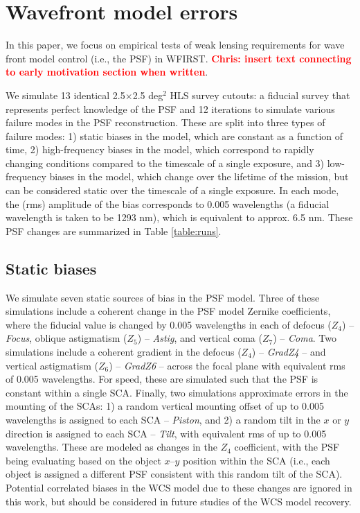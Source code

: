 \documentclass[aps,prd, amsmath,amssymb,superscriptaddress,showkeys,nofootinbib,reprint,preprintnumbers]{revtex4-1}
\newcommand{\verify}[1]{\textcolor{red}{\textbf{{#1}}}}
\begin{document}
\section{Wavefront model errors}\label{sec:results}

In this paper, we focus on empirical tests of weak lensing requirements for wave front model control (i.e., the PSF) in WFIRST. \verify{Chris: insert text connecting to early motivation section when written}. 

We simulate 13 identical 2.5$\times$2.5 deg$^2$ HLS survey cutouts: a fiducial survey that represents perfect knowledge of the PSF and 12 iterations to simulate various failure modes in the PSF reconstruction. 
These are split into three types of failure modes: 1) static biases in the model, which are constant as a function of time, 2) high-frequency biases in the model, which correspond to rapidly changing conditions compared to the timescale of a single exposure, and 3) low-frequency biases in the model, which change over the lifetime of the mission, but can be considered static over the timescale of a single exposure. 
In each mode, the (rms) amplitude of the bias corresponds to 0.005 wavelengths (a fiducial wavelength is taken to be 1293 nm), which is equivalent to approx. 6.5 nm.  These PSF changes are summarized in Table \ref{table:runs}.

\subsection{Static biases}\label{sec:static}

We simulate seven static sources of bias in the PSF model. 
Three of these simulations include a coherent change in the PSF model Zernike coefficients, where the fiducial value is changed by 0.005 wavelengths in each of defocus ($Z_4$) -- \emph{Focus}, oblique astigmatism ($Z_5$) -- \emph{Astig}, and vertical coma ($Z_7$) -- \emph{Coma}. 
Two simulations include a coherent gradient in the defocus ($Z_4$) -- \emph{GradZ4} -- and vertical astigmatism ($Z_6$) -- \emph{GradZ6} -- across the focal plane with equivalent rms of 0.005 wavelengths. 
For speed, these are simulated such that the PSF is constant within a single SCA. Finally, two simulations approximate errors in the mounting of the SCAs: 1) a random vertical mounting offset of up to 0.005 wavelengths is assigned to each SCA  -- \emph{Piston}, and 2) a random tilt in the $x$ or $y$ direction is assigned to each SCA  -- \emph{Tilt}, with equivalent rms of up to 0.005 wavelengths. 
These are modeled as changes in the $Z_4$ coefficient, with the PSF being evaluating based on the object $x$--$y$ position within the SCA (i.e., each object is assigned a different PSF consistent with this random tilt of the SCA). 
Potential correlated biases in the WCS model due to these changes are ignored in this work, but should be considered in future studies of the WCS model recovery.
\end{document}
